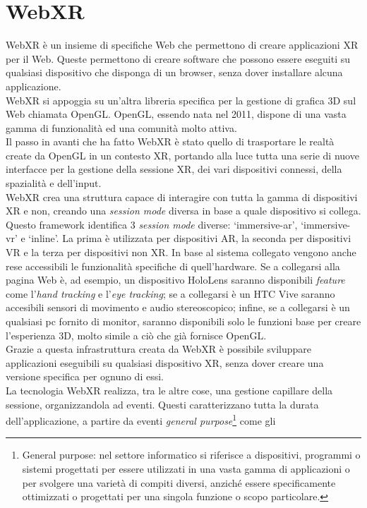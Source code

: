 \section{WebXR}\label{sec:WebXR}
WebXR è un insieme di specifiche Web che permettono di creare applicazioni XR per il Web. Queste permettono di creare software che possono essere eseguiti su qualsiasi dispositivo
che disponga di un browser, senza dover installare alcuna applicazione\cite{WebXR}.\\
WebXR si appoggia su un'altra libreria specifica per la gestione di grafica 3D sul Web chiamata OpenGL. OpenGL, essendo nata nel 2011, dispone di una vasta gamma di funzionalità
ed una comunità molto attiva.\\
Il passo in avanti che ha fatto WebXR è stato quello di trasportare le realtà create da OpenGL in un contesto XR, portando alla luce tutta una serie di nuove interfacce per la gestione
della sessione XR, dei vari dispositivi connessi, della spazialità e dell'input.\\
WebXR crea una struttura capace di interagire con tutta la gamma di dispositivi XR e non, creando una \textit{session mode} diversa in base a quale dispositivo si collega. Questo
framework identifica 3 \textit{session mode} diverse: `immersive-ar', `immersive-vr' e `inline'. La prima è utilizzata per dispositivi AR, la seconda per dispositivi VR e la terza
per dispositivi non XR. In base al sistema collegato vengono anche rese accessibili le funzionalità specifiche di quell'hardware. Se a collegarsi alla pagina Web è, ad esempio, un 
dispositivo HoloLens saranno disponibili \textit{feature} come l'\textit{hand tracking} e l'\textit{eye tracking}; se a collegarsi è un HTC Vive saranno accesibili sensori di movimento
e audio stereoscopico; infine, se a collegarsi è un qualsiasi pc fornito di monitor, saranno disponibili solo le funzioni base per creare l'esperienza 3D, molto simile a ciò che 
già fornisce OpenGL.\\
Grazie a questa infrastruttura creata da WebXR è possibile sviluppare applicazioni eseguibili su qualsiasi dispositivo XR, senza dover creare una versione specifica per ognuno di essi.\\
\newline
La tecnologia WebXR realizza, tra le altre cose, una gestione capillare della sessione, organizzandola ad eventi. Questi caratterizzano tutta la durata dell'applicazione, a partire da eventi \textit{general purpose}\footnote{General purpose: nel settore informatico si riferisce a dispositivi, programmi o sistemi progettati per essere utilizzati in una vasta gamma di applicazioni o per svolgere una varietà di compiti diversi, anziché essere specificamente ottimizzati o progettati per una singola funzione o scopo particolare.} come gli 
